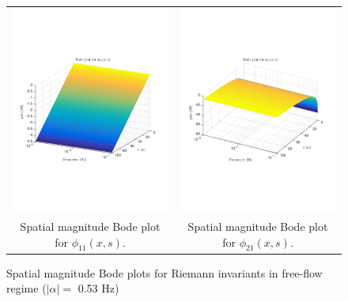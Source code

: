 \documentclass[preprint]{elsarticle}
\begin{document}
\begin{figure}
\centering
\begin{tabular}{cc}
\includegraphics[trim = 0mm 60mm 0mm 60mm, width = 8cm]{Bode_free_flow/distr_diag_phi_11}
&
\includegraphics[trim = 0mm 60mm 0mm 60mm, width = 8cm]{Bode_free_flow/distr_diag_phi_21}
\tabularnewline
Spatial magnitude Bode plot for $\phi_{11}(x,s)$.
&
Spatial magnitude Bode plot for $\phi_{21}(x,s)$.
\tabularnewline
\end{tabular}
\caption{Spatial magnitude Bode plots for Riemann invariants in free-flow regime ($\left|\alpha\right| = $ 0.53 Hz)\label{fig:Magn_spatial_diag}}
\end{figure}
\end{document}
